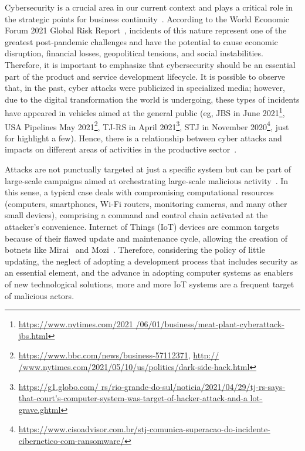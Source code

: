 \documentclass[12pt]{article}
\begin{document}
Cybersecurity is a crucial area in our current context and plays a critical role in the strategic points for business continuity~\cite{wef}. According to the World Economic Forum 2021 Global Risk Report~\cite{wefrep2021}, incidents of this nature represent one of the greatest post-pandemic challenges and have the potential to cause economic disruption, financial losses, geopolitical tensions, and social instabilities. Therefore, it is important to emphasize that cybersecurity should be an essential part of the product and service development lifecycle. It is possible to observe that, in the past, cyber attacks were publicized in specialized media; however, due to the digital transformation the world is undergoing, these types of incidents have appeared in vehicles aimed at the general public (eg, JBS in June 2021\footnote{\url{https://www.nytimes.com/2021 /06/01/business/meat-plant-cyberattack-jbs.html}}, USA Pipelines May 2021\footnote{\url{https://www.bbc.com/news/business-57112371}, \url{http:// /www.nytimes.com/2021/05/10/us/politics/dark-side-hack.html}}, TJ-RS in April 2021\footnote{\url{https://g1.globo.com/ rs/rio-grande-do-sul/noticia/2021/04/29/tj-rs-says-that-court's-computer-system-was-target-of-hacker-attack-and-a lot- grave.ghtml}}, STJ in November 2020\footnote{\url{https://www.cisoadvisor.com.br/stj-comunica-superacao-do-incidente-cibernetico-com-ransomware/}}, just for highlight a few). Hence, there is a relationship between cyber attacks and impacts on different areas of activities in the productive sector~\cite{costs}.

Attacks are not punctually targeted at just a specific system but can be part of large-scale campaigns aimed at orchestrating large-scale malicious activity~\cite{iotbotnet}. In this sense, a typical case deals with compromising computational resources (computers, smartphones, Wi-Fi routers, monitoring cameras, and many other small devices), comprising a command and control chain activated at the attacker's convenience. Internet of Things (IoT) devices are common targets because of their flawed update and maintenance cycle, allowing the creation of botnets like Mirai~\cite{mirai} and Mozi~\cite{mozi}. Therefore, considering the policy of little updating, the neglect of adopting a development process that includes security as an essential element, and the advance in adopting computer systems as enablers of new technological solutions, more and more IoT systems are a frequent target of malicious actors.
\end{document}
